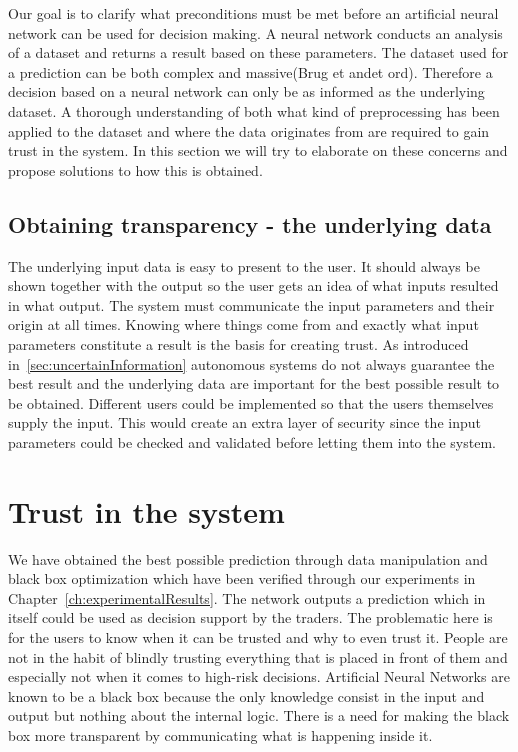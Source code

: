 Our goal is to clarify what preconditions must be met before an artificial neural network can be used for decision making. A neural network conducts an analysis of a dataset and returns a result based on these parameters. The dataset used for a prediction can be both complex and massive(Brug et andet ord). Therefore a decision based on a neural network can only be as informed as the underlying dataset. A thorough understanding of both what kind of preprocessing has been applied to the dataset and where the data originates from are required to gain trust in the system. In this section we will try to elaborate on these concerns and propose solutions to how this is obtained.

\subsection{Obtaining transparency - the underlying data}
The underlying input data is easy to present to the user. It should always be shown together with the output so the user gets an idea of what inputs resulted in what output. The system must communicate the input parameters and their origin at all times. Knowing where things come from and exactly what input parameters constitute a result is the basis for creating trust. As introduced in~\ref{sec:uncertainInformation} autonomous systems do not always guarantee the best result and the underlying data are important for the best possible result to be obtained. Different users  could be implemented so that the users themselves supply the input. This would create an extra layer of security since the input parameters could be checked and validated before letting them into the system. 

\section{Trust in the system}
We have obtained the best possible prediction through data manipulation and black box optimization which have been verified through our experiments in Chapter~\ref{ch:experimentalResults}. The network outputs a prediction which in itself could be used as decision support by the traders. The problematic here is for the users to know when it can be trusted and why to even trust it. People are not in the habit of blindly trusting everything that is placed in front of them and especially not when it comes to high-risk decisions. 
Artificial Neural Networks are known to be a black box \cite{fromBlackBoxToTransparentBox} because the only knowledge consist in the input and output but nothing about the internal logic. There is a need for making the black box more transparent by communicating what is happening inside it. 

